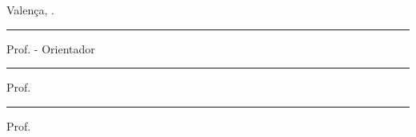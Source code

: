 \vspace{2\baselineskip}
\hfill Valença, .
\vspace{3\baselineskip}

\begin{center}
    \begin{minipage}[!h]{0.85\textwidth}
        \centering
        \rule{\textwidth}{0.4pt}\par
        \noindent Prof. \MakeUppercase{\advisor} - Orientador\par
        \noindent\instituteAdvisor
    \end{minipage}%
    \vspace{3.5\baselineskip}    
    \begin{minipage}[!h]{0.85\textwidth}
        \centering
        \rule{\textwidth}{0.4pt}\par
        \noindent Prof. \MakeUppercase{\membroBancaUm}\par
        \noindent\instituteMembroUm
    \end{minipage}%
    \vspace{3.5\baselineskip}    
    \begin{minipage}[!h]{0.85\textwidth}
        \centering
        \rule{\textwidth}{0.4pt}\par
        \noindent Prof. \MakeUppercase{\membroBancaDois}\par
        \noindent\instituteMembroDois
    \end{minipage}
\end{center}